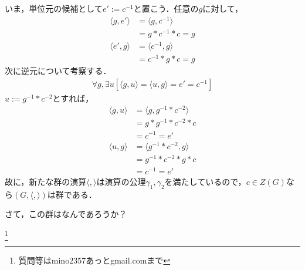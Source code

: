 \documentclass[dvipdfmx,12pt]{jsarticle}
\begin{document}
いま，単位元の候補として$e':=c^{-1}$と置こう．任意の$g$に対して，
\begin{align*}
\langle g,e' \rangle &= \langle g,c^{-1} \rangle \\
&=g * c^{-1} * c = g
\end{align*}
\begin{align*}
\langle e',g \rangle &= \langle c^{-1},g \rangle \\
&=c^{-1} * g * c = g
\end{align*}
次に逆元について考察する．
\begin{align*}
\forall g,\exists u [\langle g,u \rangle = \langle u,g \rangle = e' = c^{-1}]
\end{align*}
$u:=g^{-1}*c^{-2}$とすれば，
\begin{align*}
\langle g,u \rangle &= \langle g,g^{-1}*c^{-2} \rangle \\
&=g * g^{-1}*c^{-2} *c \\
& = c^{-1} = e'
\end{align*}
\begin{align*}
\langle u,g \rangle &= \langle g^{-1}*c^{-2},g \rangle \\
&=g^{-1}*c^{-2} * g *c\\
& = c^{-1} = e'
\end{align*}
故に，新たな群の演算$\langle , \rangle$は演算の公理$\gamma_1, \gamma_2$を満たしているので，$c \in Z(G)$なら$(G,\langle , \rangle)$は群である．

さて，この群はなんであろうか？

\footnote[0]{
質問等はmino2357あっとgmail.comまで
}

\thispagestyle{empty}
\end{document}
